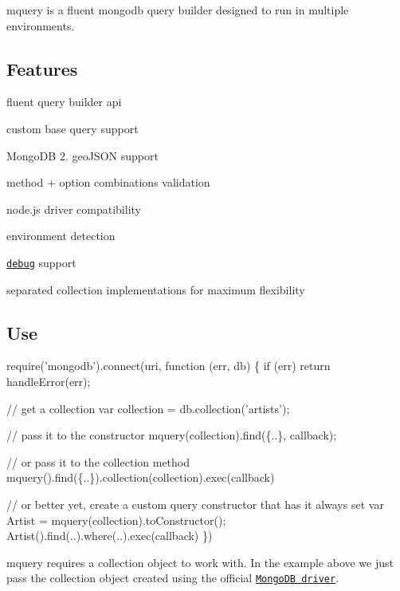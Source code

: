 {\ttfamily mquery} is a fluent mongodb query builder designed to run in multiple environments.

\href{https://travis-ci.org/aheckmann/mquery}{\tt } \href{http://badge.fury.io/js/mquery}{\tt }

\href{https://www.npmjs.com/package/mquery}{\tt }

\subsection*{Features}


\begin{DoxyItemize}
\item fluent query builder api
\item custom base query support
\item Mongo\+DB 2. geo\+J\+S\+ON support
\item method + option combinations validation
\item node.\+js driver compatibility
\item environment detection
\item \href{https://github.com/visionmedia/debug}{\tt debug} support
\item separated collection implementations for maximum flexibility
\end{DoxyItemize}

\subsection*{Use}


\begin{DoxyCode}
require('mongodb').connect(uri, function (err, db) \{
  if (err) return handleError(err);

  // get a collection
  var collection = db.collection('artists');

  // pass it to the constructor
  mquery(collection).find(\{..\}, callback);

  // or pass it to the collection method
  mquery().find(\{..\}).collection(collection).exec(callback)

  // or better yet, create a custom query constructor that has it always set
  var Artist = mquery(collection).toConstructor();
  Artist().find(..).where(..).exec(callback)
\})
\end{DoxyCode}


{\ttfamily mquery} requires a collection object to work with. In the example above we just pass the collection object created using the official \href{https://github.com/mongodb/node-mongodb-native}{\tt Mongo\+DB driver}.

